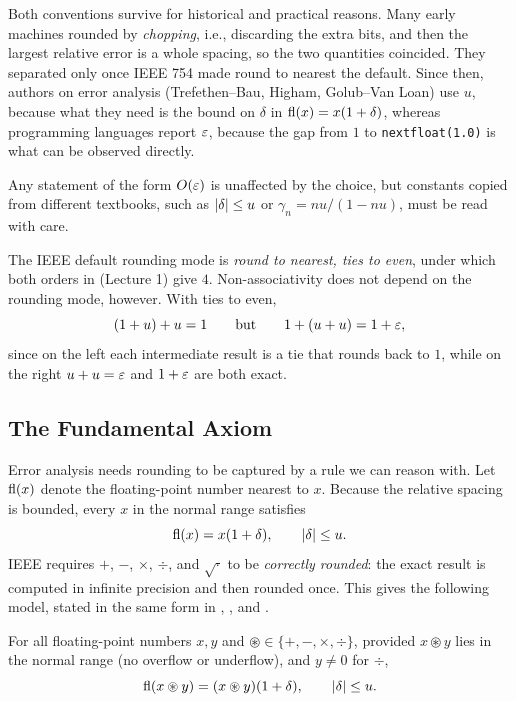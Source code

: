 Both conventions survive for historical and practical reasons. Many early machines rounded by \emph{chopping}, i.e., discarding the extra bits, and then the largest relative error is a whole spacing, so the two quantities coincided. They separated only once IEEE 754 made round to nearest the default. Since then, authors on error analysis (Trefethen--Bau, Higham, Golub--Van Loan) use $u$, because what they need is the bound on $\delta$ in $\operatorname{fl}(x) = x(1 + \delta)$, whereas programming languages report $\varepsilon$, because the gap from $1$ to \texttt{nextfloat(1.0)} is what can be observed directly.

Any statement of the form $O(\varepsilon)$ is unaffected by the choice, but constants copied from different textbooks, such as $\left\lvert \delta \right\rvert \le u$ or $\gamma_n = nu/(1 - nu)$, must be read with care.

The IEEE default rounding mode is \emph{round to nearest, ties to even}, under which both orders in  (Lecture 1) give $4$. Non-associativity does not depend on the rounding mode, however. With ties to even,
\begin{equation}
  (1 + u) + u = 1 \qquad \text{but} \qquad 1 + (u + u) = 1 + \varepsilon,
\end{equation}
since on the left each intermediate result is a tie that rounds back to $1$, while on the right $u + u = \varepsilon$ and $1 + \varepsilon$ are both exact.

\subsection{The Fundamental Axiom}

Error analysis needs rounding to be captured by a rule we can reason with. Let $\operatorname{fl}(x)$ denote the floating-point number nearest to $x$. Because the relative spacing is bounded, every $x$ in the normal range satisfies
\begin{equation}
  \operatorname{fl}(x) = x(1 + \delta), \qquad \left\lvert \delta \right\rvert \le u. \label{eq:fl}
\end{equation}
IEEE requires $+$, $-$, $\times$, $\div$, and $\sqrt{\cdot}$ to be \emph{correctly rounded}: the exact result is computed in infinite precision and then rounded once. This gives the following model, stated in the same form in \cite[Lecture 13]{TB}, \cite[\S2.4]{GVL}, and \cite[\S1.5]{Demmel}.

\begin{theorem}
  \label{thm:axiom}
  For all floating-point numbers $x, y$ and $\circledast \in \{+, -, \times, \div\}$, provided $x \circledast y$ lies in the normal range (no overflow or underflow), and $y \ne 0$ for $\div$,
  \begin{equation}
    \operatorname{fl}(x \circledast y) = (x \circledast y)(1 + \delta), \qquad \left\lvert \delta \right\rvert \le u.
  \end{equation}
\end{theorem}

